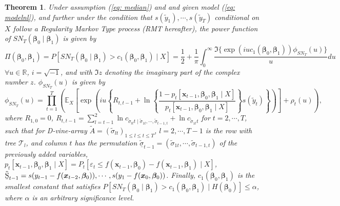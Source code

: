 \documentclass[harvard,11pt]{article}
\newcommand{\E}{\mathbb{E}}
\newtheorem{theorem}{Theorem}
\begin{document}
\begin{theorem}\label{Theorem1} 
Under assumption (\ref{eq: median}) and and given model (\ref{eq: modelnl}), and further under the condition that $s(\tilde{y}_1),\cdots,s(\tilde{y}_T)$ conditional on $X$ follow a Regularity Markov Type process (RMT hereafter), the power function of $SN_{T}(\bm{\beta}_0\mid\bm{\beta}_{1})$ is given by
\[
\Pi(\bm{\beta}_0,\bm{\beta}_1)=P[SN_T(\bm{\beta}_0\mid \bm{\beta}_1)> c_1(\bm{\beta}_0,\bm{\beta}_1)\mid X]=\frac{1}{2}+\frac{1}{\pi}\int_{0}^{\infty}\frac{\Im\{\exp(iuc_1(\bm{\beta}_0,\bm{\beta}_1))\phi_{SN_T}(u)\}}{u}du
\] 
$\forall u \in \mathbb{R}$, $i=\sqrt{-1}$, and with $\Im{z}$ denoting the imaginary part of the complex number $z$. $\phi_{SN_T}(u)$ is given by
\[
\phi_{SN_T}(u)=\prod\limits_{t=1}^{T}\left(\E_X\left[\exp\left(iu\left\{R_{t,t-1}+\ln\left\{\frac{1-p_t[\bm{x}_{t-1},\bm{\beta}_0,\bm{\beta}_1\mid X]}{p_t[\bm{x}_{t-1},\bm{\beta}_0,\bm{\beta}_1\mid X]}\right\}s(\tilde{y}_t)\right\}\right)\right]+\rho_t(u)\right),
\]
where $R_{1,0}=0$, $R_{t,t-1}=\sum\limits_{l=t-1}^{2}\ln c_{\tilde{\sigma}_{lt}t\mid \tilde{\sigma}_{1t},\cdots,\tilde{\sigma}_{t-1,t}}+\ln c_{\tilde{\sigma}_{1t}t}$ for $t=2,\cdots,T$, such that for D-vine-array $\tilde{A}=(\tilde{\sigma}_{lt})_{1\leq l\leq t\leq T}$, $l=2,\cdots,T-1$ is the row with tree $\mathcal{T}_l$, and column $t$ has the permutation $\tilde{\underline{\sigma}}_{t-1}=(\tilde{\sigma}_{1t},\cdots,\tilde{\sigma}_{t-1,t})$ of the previously added variables, $p_t[\bm{x}_{t-1},\bm{\beta}_0,\bm{\beta}_1\mid X]=P_t[\varepsilon_t\leq f(\bm{x}_{t-1},\bm{\beta}_0)-f(\bm{x}_{t-1},\bm{\beta}_1)\mid X]$, $\tilde{\text{\b{S}}}_{t-1}=s(y_{t-1}-f(\bm{x}_{t-2},\bm{\beta}_0)),\cdots,s(y_{1}-f(\bm{x}_{0},\bm{\beta}_0))$.
Finally, $c_1(\bm{\beta}_0,\bm{\beta}_1)$ is the smallest constant that satisfies $P[SN_T(\bm{\beta}_0\mid\bm{\beta}_1)>c_1(\bm{\beta}_0,\bm{\beta}_1)\mid H(\bm{\beta}_0)]\leq \alpha$, where $\alpha$ is an arbitrary significance level. 
\end{theorem}
\end{document}
